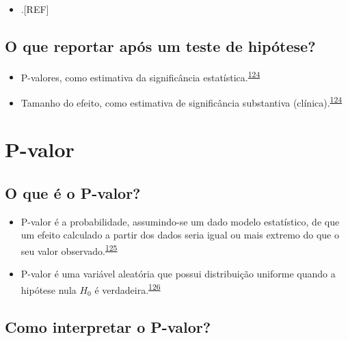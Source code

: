 \documentclass[
  a4paper,
]{book}
\providecommand{\tightlist}{%
  \setlength{\itemsep}{0pt}\setlength{\parskip}{0pt}}
\begin{document}
\begin{itemize}
\tightlist
\item
  .{[}REF{]}
\end{itemize}

\hypertarget{o-que-reportar-apuxf3s-um-teste-de-hipuxf3tese}{%
\subsection{O que reportar após um teste de hipótese?}\label{o-que-reportar-apuxf3s-um-teste-de-hipuxf3tese}}

\begin{itemize}
\item
  P-valores, como estimativa da significância estatística.\textsuperscript{\protect\hyperlink{ref-Sullivan2012}{124}}
\item
  Tamanho do efeito, como estimativa de significância substantiva (clínica).\textsuperscript{\protect\hyperlink{ref-Sullivan2012}{124}}
\end{itemize}

\hypertarget{p-valor}{%
\section{P-valor}\label{p-valor}}

\hypertarget{o-que-uxe9-o-p-valor}{%
\subsection{O que é o P-valor?}\label{o-que-uxe9-o-p-valor}}

\begin{itemize}
\item
  P-valor é a probabilidade, assumindo-se um dado modelo estatístico, de que um efeito calculado a partir dos dados seria igual ou mais extremo do que o seu valor observado.\textsuperscript{\protect\hyperlink{ref-wasserstein2016}{125}}
\item
  P-valor é uma variável aleatória que possui distribuição uniforme quando a hipótese nula \(H_{0}\) é verdadeira.\textsuperscript{\protect\hyperlink{ref-altman2017}{126}}
\end{itemize}

\hypertarget{como-interpretar-o-p-valor}{%
\subsection{Como interpretar o P-valor?}\label{como-interpretar-o-p-valor}}
\end{document}
